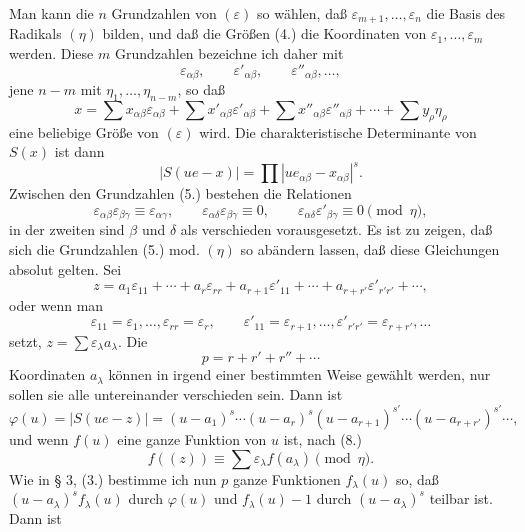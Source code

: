 \documentclass[11pt]{article}
\newcommand{\eps}{\varepsilon}
\begin{document}
Man kann die $n$ Grundzahlen von $(\eps)$ so wählen, daß $\eps_{m+1},\ldots,\eps_n$ die Basis des Radikals $(\eta)$ bilden, und daß die Größen (4.) die Koordinaten von $\eps_1,\ldots,\eps_m$ werden. Diese $m$ Grundzahlen bezeichne ich daher mit
\begin{equation}\tag{5.}
 \eps_{\alpha\beta},\qquad \eps'_{\alpha\beta},\qquad \eps''_{\alpha\beta},\ldots,
\end{equation}
jene $n-m$ mit $\eta_1,\ldots,\eta_{n-m}$, so daß
\begin{equation}\tag{6.}
 x=\sum x_{\alpha\beta}\eps_{\alpha\beta}
 +\sum x'_{\alpha\beta}\eps'_{\alpha\beta}
 +\sum x''_{\alpha\beta}\eps''_{\alpha\beta}
 +\cdots+\sum y_\rho\eta_\rho
\end{equation}
eine beliebige Größe von $(\eps)$ wird. Die charakteristische Determinante von $S(x)$ ist dann
\begin{equation}\tag{7.}
 |S(ue-x)|=\prod |u e_{\alpha\beta}-x_{\alpha\beta}|^{s}.
\end{equation}
Zwischen den Grundzahlen (5.) bestehen die Relationen
\begin{equation}\tag{8.}
 \eps_{\alpha\beta}\eps_{\beta\gamma}\equiv\eps_{\alpha\gamma},
 \qquad
 \eps_{\alpha\delta}\eps_{\beta\gamma}\equiv0,
 \qquad
 \eps_{\alpha\delta}\eps'_{\beta\gamma}\equiv0
 \pmod{\eta},
\end{equation}
in der zweiten sind $\beta$ und $\delta$ als verschieden vorausgesetzt. Es ist zu zeigen, daß sich die Grundzahlen (5.) mod. $(\eta)$ so abändern lassen, daß diese Gleichungen absolut gelten. Sei
\[
 z=a_1\eps_{11}+\cdots+a_r\eps_{rr}+a_{r+1}\eps'_{11}+\cdots+a_{r+r'}\eps'_{r'r'}+\cdots,
\]
oder wenn man
\begin{equation}\tag{9.}
 \eps_{11}=\eps_1,
 \ldots,
 \eps_{rr}=\eps_r,
 \qquad
 \eps'_{11}=\eps_{r+1},
 \ldots,
 \eps'_{r'r'}=\eps_{r+r'},\ldots
\end{equation}
setzt, $z=\sum \eps_\lambda a_\lambda$. Die
\begin{equation}\tag{10.}
 p=r+r'+r''+\cdots
\end{equation}
Koordinaten $a_\lambda$ können in irgend einer bestimmten Weise gewählt werden, nur sollen sie alle untereinander verschieden sein. Dann ist
\[
 \varphi(u)=|S(ue-z)|=(u-a_1)^s\cdots(u-a_r)^s(u-a_{r+1})^{s'}\cdots(u-a_{r+r'})^{s'}\cdots,
\]
und wenn $f(u)$ eine ganze Funktion von $u$ ist, nach (8.)
\[
 f((z))\equiv \sum \eps_\lambda f(a_\lambda)\pmod{\eta}.
\]
Wie in § 3, (3.) bestimme ich nun $p$ ganze Funktionen $f_\lambda(u)$ so, daß $(u-a_\lambda)^s f_\lambda(u)$ durch $\varphi(u)$ und $f_\lambda(u)-1$ durch $(u-a_\lambda)^s$ teilbar ist. Dann ist
\end{document}
